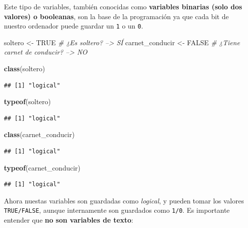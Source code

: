 \documentclass[11pt,]{book}
\newenvironment{Shaded}{\begin{snugshade}}{\end{snugshade}}
\newcommand{\CommentTok}[1]{\textcolor[rgb]{0.37,0.37,0.37}{\textit{#1}}}
\newcommand{\KeywordTok}[1]{\textcolor[rgb]{0.27,0.27,0.27}{\textbf{#1}}}
\newcommand{\NormalTok}[1]{#1}
\newcommand{\OtherTok}[1]{\textcolor[rgb]{0.37,0.37,0.37}{#1}}
\newcommand{\StringTok}[1]{\textcolor[rgb]{0.5,0.5,0.5}{#1}}
\begin{document}
Este tipo de variables, también conocidas como \textbf{variables binarias (solo dos valores) o booleanas}, son la base de la programación ya que cada bit de nuestro ordenador puede guardar un \texttt{1} o un \texttt{0}.

\begin{Shaded}
\begin{Highlighting}[]
\NormalTok{soltero <-}\StringTok{ }\OtherTok{TRUE} \CommentTok{# ¿Es soltero? --> SÍ}
\NormalTok{carnet_conducir <-}\StringTok{ }\OtherTok{FALSE} \CommentTok{# ¿Tiene carnet de conducir? --> NO}

\KeywordTok{class}\NormalTok{(soltero)}
\end{Highlighting}
\end{Shaded}

\begin{verbatim}
## [1] "logical"
\end{verbatim}

\begin{Shaded}
\begin{Highlighting}[]
\KeywordTok{typeof}\NormalTok{(soltero)}
\end{Highlighting}
\end{Shaded}

\begin{verbatim}
## [1] "logical"
\end{verbatim}

\begin{Shaded}
\begin{Highlighting}[]
\KeywordTok{class}\NormalTok{(carnet_conducir)}
\end{Highlighting}
\end{Shaded}

\begin{verbatim}
## [1] "logical"
\end{verbatim}

\begin{Shaded}
\begin{Highlighting}[]
\KeywordTok{typeof}\NormalTok{(carnet_conducir)}
\end{Highlighting}
\end{Shaded}

\begin{verbatim}
## [1] "logical"
\end{verbatim}

Ahora nuestas variables son guardadas como \emph{logical}, y pueden tomar los valores \texttt{TRUE/FALSE}, aunque internamente son guardados como \texttt{1/0}. Es importante entender que \textbf{no son variables de texto}:
\end{document}
